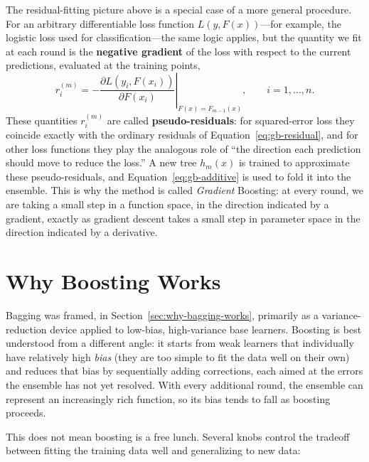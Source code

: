 \documentclass[12pt,a4paper]{article}
\begin{document}
The residual-fitting picture above is a special case of a more general procedure. For an arbitrary differentiable loss function $L(y, F(x))$---for example, the logistic loss used for classification---the same logic applies, but the quantity we fit at each round is the \textbf{negative gradient} of the loss with respect to the current predictions, evaluated at the training points,
$$
r_i^{(m)} = -\left.\frac{\partial L(y_i, F(x_i))}{\partial F(x_i)}\right|_{F(x) = F_{m-1}(x)}, \qquad i = 1, \ldots, n.
$$
These quantities $r_i^{(m)}$ are called \textbf{pseudo-residuals}: for squared-error loss they coincide exactly with the ordinary residuals of Equation~\eqref{eq:gb-residual}, and for other loss functions they play the analogous role of ``the direction each prediction should move to reduce the loss.'' A new tree $h_m(x)$ is trained to approximate these pseudo-residuals, and Equation~\eqref{eq:gb-additive} is used to fold it into the ensemble. This is why the method is called \emph{Gradient} Boosting: at every round, we are taking a small step in a function space, in the direction indicated by a gradient, exactly as gradient descent takes a small step in parameter space in the direction indicated by a derivative.

\section{Why Boosting Works}

Bagging was framed, in Section~\ref{sec:why-bagging-works}, primarily as a variance-reduction device applied to low-bias, high-variance base learners. Boosting is best understood from a different angle: it starts from weak learners that individually have relatively high \emph{bias} (they are too simple to fit the data well on their own) and reduces that bias by sequentially adding corrections, each aimed at the errors the ensemble has not yet resolved. With every additional round, the ensemble can represent an increasingly rich function, so its bias tends to fall as boosting proceeds.

This does not mean boosting is a free lunch. Several knobs control the tradeoff between fitting the training data well and generalizing to new data:
\end{document}
